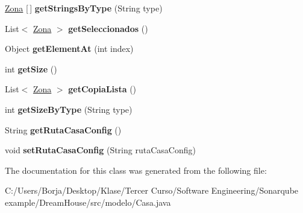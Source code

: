 \begin{DoxyCompactItemize}
\mbox{\hyperlink{classmodelo_1_1_zona}{Zona}} \mbox{[}$\,$\mbox{]} {\bfseries get\+Strings\+By\+Type} (String type)
\item 
\mbox{\label{classmodelo_1_1_casa_a2f915f8146b2bf9aac77bd76d40a7c3d}} 
List$<$ \mbox{\hyperlink{classmodelo_1_1_zona}{Zona}} $>$ {\bfseries get\+Seleccionados} ()
\item 
\mbox{\label{classmodelo_1_1_casa_a82e53172ee38914af2b3edd24d65004f}} 
Object {\bfseries get\+Element\+At} (int index)
\item 
\mbox{\label{classmodelo_1_1_casa_a81cbd6dd883f5dc86616dc292d01efb7}} 
int {\bfseries get\+Size} ()
\item 
\mbox{\label{classmodelo_1_1_casa_ae424bde8585ebf744728e2f6a79d9241}} 
List$<$ \mbox{\hyperlink{classmodelo_1_1_zona}{Zona}} $>$ {\bfseries get\+Copia\+Lista} ()
\item 
\mbox{\label{classmodelo_1_1_casa_ae81948c050f1cc75212453a626f9e48f}} 
int {\bfseries get\+Size\+By\+Type} (String type)
\item 
\mbox{\label{classmodelo_1_1_casa_a50685b459f8c975d5305478b18526914}} 
String {\bfseries get\+Ruta\+Casa\+Config} ()
\item 
\mbox{\label{classmodelo_1_1_casa_a453497c80f101aaf649b29c2dc301a6f}} 
void {\bfseries set\+Ruta\+Casa\+Config} (String ruta\+Casa\+Config)
\end{DoxyCompactItemize}


The documentation for this class was generated from the following file\+:\begin{DoxyCompactItemize}
\item 
C\+:/\+Users/\+Borja/\+Desktop/\+Klase/\+Tercer Curso/\+Software Engineering/\+Sonarqube example/\+Dream\+House/src/modelo/Casa.\+java\end{DoxyCompactItemize}
